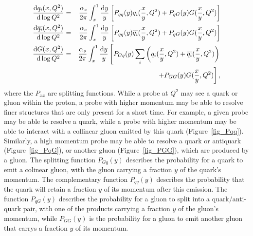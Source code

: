\begin{eqnarray}
\frac{ \mathrm{d} q_i (x, Q^2)}{\mathrm{d} \log Q^2} & = & \frac{ \alpha_s}{2 \pi } \int_x^1 \frac{\mathrm{d} y}{y}\left[ P_{qq}(y)q_i(\frac{x}{y},Q^2) + P_{qG}(y)G(\frac{x}{y},Q^2) \right] \\
\frac{\mathrm{d} \overline{q_i}(x,Q^2)}{\mathrm{d} \log Q^2} & = & \frac{\alpha_s}{2 \pi} \int_x^1 \frac{\mathrm{d} y}{y}\left[ P_{qq}(y)\overline{q_i}(\frac{x}{y},Q^2) + P_{qG}(y)G(\frac{x}{y},Q^2) \right] \\
\frac{\mathrm{d} G(x,Q^2)}{\mathrm{d} \log Q^2} & = & \frac{\alpha_s}{2 \pi} \int_x^1 \frac{\mathrm{d} y}{y}\left[ P_{Gq}(y) \sum_i \left(q_i(\frac{x}{y},Q^2) + \overline{q_i}(\frac{x}{y},Q^2) \right) \right. \nonumber\\ & & \left.+ P_{GG}(y)G(\frac{x}{y},Q^2) \right], 
\label{eqn_DGLAP}
\end{eqnarray}
where the $P_{xx}$ are splitting functions. While a probe at $Q^2$ may see a quark or gluon within the proton, a probe with higher momentum may be able to resolve finer structures that are only present for a short time. For example, a given probe may be able to resolve a quark, while a probe with higher momentum may be able to interact with a collinear gluon emitted by this quark (Figure~\ref{fig_Pqq}). Similarly, a high momentum probe may be able to resolve a quark or antiquark (Figure~\ref{fig_PqG}), or another gluon (Figure~\ref{fig_PGG}), which are produced by a gluon. The splitting function $P_{Gq}(y)$ describes the probability for a quark to emit a colinear gluon, with the gluon carrying a fraction $y$ of the quark's momentum. The complementary function $P_{qq}(y)$ describes the probability that the quark will retain a fraction $y$ of its momentum after this emission. The function $P_{qG}(y)$ describes the probability for a gluon to split into a quark/anti-quark pair, with one of the products carrying a fraction $y$ of the gluon's momentum, while $P_{GG}(y)$ is the probability for a gluon to emit another gluon that carrys a fraction $y$ of its momentum. 




